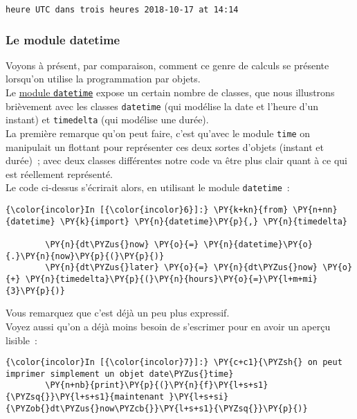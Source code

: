     \begin{Verbatim}[commandchars=\\\{\}]
heure UTC dans trois heures 2018-10-17 at 14:14

    \end{Verbatim}


    \hypertarget{le-module-datetime}{%
\subsubsection{Le module datetime}\label{le-module-datetime}}

    Voyons à présent, par comparaison, comment ce genre de calculs se
présente lorsqu'on utilise la programmation par objets.\\

Le \href{https://docs.python.org/3/library/datetime.html}{module
\texttt{datetime}} expose un certain nombre de classes, que nous
illustrons brièvement avec les classes \texttt{datetime} (qui modélise
la date et l'heure d'un instant) et \texttt{timedelta} (qui modélise une
durée).\\

La première remarque qu'on peut faire, c'est qu'avec le module
\texttt{time} on manipulait un flottant pour représenter ces deux sortes
d'objets (instant et durée)~; avec deux classes différentes notre code
va être plus clair quant à ce qui est réellement représenté.\\

    Le code ci-dessus s'écrirait alors, en utilisant le module
\texttt{datetime}~:

    \begin{Verbatim}[commandchars=\\\{\}]
{\color{incolor}In [{\color{incolor}6}]:} \PY{k+kn}{from} \PY{n+nn}{datetime} \PY{k}{import} \PY{n}{datetime}\PY{p}{,} \PY{n}{timedelta}
        
        \PY{n}{dt\PYZus{}now} \PY{o}{=} \PY{n}{datetime}\PY{o}{.}\PY{n}{now}\PY{p}{(}\PY{p}{)}
        \PY{n}{dt\PYZus{}later} \PY{o}{=} \PY{n}{dt\PYZus{}now} \PY{o}{+} \PY{n}{timedelta}\PY{p}{(}\PY{n}{hours}\PY{o}{=}\PY{l+m+mi}{3}\PY{p}{)}
\end{Verbatim}


    Vous remarquez que c'est déjà un peu plus expressif.\\

Voyez aussi qu'on a déjà moins besoin de s'escrimer pour en avoir un
aperçu lisible~:

    \begin{Verbatim}[commandchars=\\\{\}]
{\color{incolor}In [{\color{incolor}7}]:} \PY{c+c1}{\PYZsh{} on peut imprimer simplement un objet date\PYZus{}time}
        \PY{n+nb}{print}\PY{p}{(}\PY{n}{f}\PY{l+s+s1}{\PYZsq{}}\PY{l+s+s1}{maintenant }\PY{l+s+si}{\PYZob{}dt\PYZus{}now\PYZcb{}}\PY{l+s+s1}{\PYZsq{}}\PY{p}{)}
\end{Verbatim}


